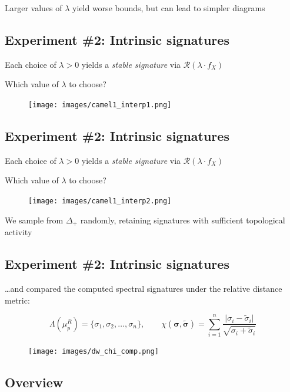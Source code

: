 \documentclass[
  letterpaper,
  DIV=11,
  numbers=noendperiod,
  oneside]{scrartcl}
\begin{document}
Larger values of \(\lambda\) yield worse bounds, but can lead to simpler
diagrams

\subsection{Experiment \#2: Intrinsic
signatures}\label{experiment-2-intrinsic-signatures-7}

Each choice of \(\lambda > 0\) yields a \emph{stable signature} via
\(\mathcal{R}(\lambda \cdot f_X)\)

Which value of \(\lambda\) to choose?

\begin{figure}

{\centering \texttt{[image: images/camel1\_interp1.png]}

}

\end{figure}

\subsection{Experiment \#2: Intrinsic
signatures}\label{experiment-2-intrinsic-signatures-8}

Each choice of \(\lambda > 0\) yields a \emph{stable signature} via
\(\mathcal{R}(\lambda \cdot f_X)\)

Which value of \(\lambda\) to choose?

\begin{figure}

{\centering \texttt{[image: images/camel1\_interp2.png]}

}

\end{figure}

We sample from \(\Delta_+\) randomly, retaining signatures with
sufficient topological activity

\subsection{Experiment \#2: Intrinsic
signatures}\label{experiment-2-intrinsic-signatures-9}

\ldots and compared the computed spectral signatures under the relative
distance metric:

\[
\Lambda(\mu_p^R) = \{\sigma_1, \sigma_2, \dots, \sigma_n \}, \quad \quad \chi(\mathbf{\sigma}, \mathbf{\tilde{\sigma}}) = \sum\limits_{i=1}^n \frac{\lvert \sigma_i - \tilde{\sigma}_i \rvert}{\sqrt{\sigma_i + \tilde{\sigma}_i}}
\]

\begin{figure}

{\centering \texttt{[image: images/dw\_chi\_comp.png]}

}

\end{figure}

\subsection{Overview}\label{overview-2}
\end{document}

